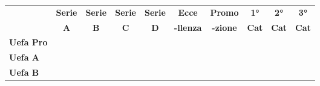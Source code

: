 \documentclass[../uefaC.tex]{subfiles}
\begin{document}
\begin{table}[!htbp]
    \begin{tabular}{llllllllll}
                       & \multicolumn{1}{c}{\textbf{Serie}}                     & \multicolumn{1}{c}{\textbf{Serie}}              & \multicolumn{1}{c}{\textbf{Serie}}              & \multicolumn{1}{c}{\textbf{Serie}}              & \multicolumn{1}{c}{\textbf{Ecce}}               & \multicolumn{1}{c}{\textbf{Promo}}              & \multicolumn{1}{c}{\textbf{1°}}                 & \multicolumn{1}{c}{\textbf{2°}}                 & \multicolumn{1}{c}{\textbf{3°}}                 \\
    \textbf{}          & \multicolumn{1}{c}{\cellcolor[HTML]{FFFFFF}\textbf{A}} & \multicolumn{1}{c}{\textbf{B}}                  & \multicolumn{1}{c}{\textbf{C}}                  & \multicolumn{1}{c}{\textbf{D}}                  & \multicolumn{1}{c}{\textbf{-llenza}}            & \multicolumn{1}{c}{\textbf{-zione}}             & \multicolumn{1}{c}{\textbf{Cat}}                & \multicolumn{1}{c}{\textbf{Cat}}                & \multicolumn{1}{c}{\textbf{Cat}}                \\
    \textbf{Uefa Pro}  & \cellcolor[HTML]{FE0000}                               & \cellcolor[HTML]{FE0000}                        & \cellcolor[HTML]{FE0000}                        & \cellcolor[HTML]{FE0000}                        & \cellcolor[HTML]{FE0000}                        & \cellcolor[HTML]{FE0000}                        & \cellcolor[HTML]{FE0000}                        & \cellcolor[HTML]{FE0000}                        & \cellcolor[HTML]{FE0000}                        \\
    \textbf{Uefa A}    &                                                        & \cellcolor[HTML]{F8FF00}{\color[HTML]{FFFFFF} } & \cellcolor[HTML]{F8FF00}{\color[HTML]{FFFFFF} } & \cellcolor[HTML]{F8FF00}{\color[HTML]{FFFFFF} } & \cellcolor[HTML]{F8FF00}{\color[HTML]{FFFFFF} } & \cellcolor[HTML]{F8FF00}{\color[HTML]{FFFFFF} } & \cellcolor[HTML]{F8FF00}{\color[HTML]{FFFFFF} } & \cellcolor[HTML]{F8FF00}{\color[HTML]{FFFFFF} } & \cellcolor[HTML]{F8FF00}{\color[HTML]{FFFFFF} } \\
    \textbf{Uefa B}    &                                                        &                                                 &                                                 & \cellcolor[HTML]{34FF34}                        & \cellcolor[HTML]{34FF34}                        & \cellcolor[HTML]{34FF34}                        & \cellcolor[HTML]{34FF34}                        & \cellcolor[HTML]{34FF34}                        & \cellcolor[HTML]{34FF34}                        \\

\end{tabular}
\end{table}
\end{document}

